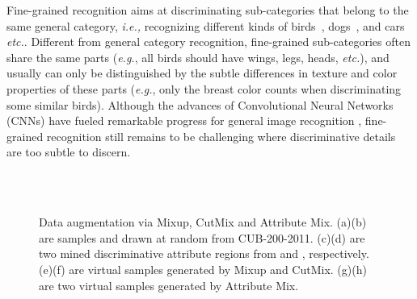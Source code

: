 \documentclass[runningheads]{llncs}
\begin{document}
\noindent Fine-grained recognition aims at discriminating sub-categories that belong to the same general category, \emph{i.e.,} recognizing different kinds of birds~\cite{wah2011caltech,Berg2014BirdsnapLF}, dogs~\cite{KhoslaYaoJayadevaprakashFeiFei_FGVC2011}, and cars~\cite{KrauseStarkDengFei-Fei_3DRR2013} \emph{etc.}.  Different from general category recognition, fine-grained sub-categories often share the same parts (\emph{e.g.}, all birds should have wings, legs, heads, \emph{etc.}), and usually can only be distinguished by the subtle differences in texture and color properties of these parts (\emph{e.g.}, only the breast color counts when discriminating some similar birds). Although the advances of Convolutional Neural Networks (CNNs) have fueled remarkable progress for general image recognition \cite{hu2018squeeze,simonyan2014very,he2016deep,wang2017residual}, fine-grained recognition still remains to be challenging where discriminative details are too subtle to discern.
\begin{figure}[t]
  \centering
   \hspace{0.17cm}
   \hspace{0.17cm}
   \hspace{0.17cm}
   \\
  \vspace{-0.1cm}
   \hspace{0.17cm}
   \hspace{0.17cm}
   \hspace{0.17cm}
   \\
  \vspace{-0.2cm}
  \caption{Data augmentation via Mixup, CutMix and Attribute Mix. (a)(b) are samples  and  drawn at random from CUB-200-2011. (c)(d) are two mined discriminative attribute regions from  and , respectively. (e)(f) are virtual samples generated by Mixup and CutMix. (g)(h) are two virtual samples generated by Attribute Mix.}
  \label{Mix-result}
 \vspace{-0.3cm}
\end{figure}
\end{document}
